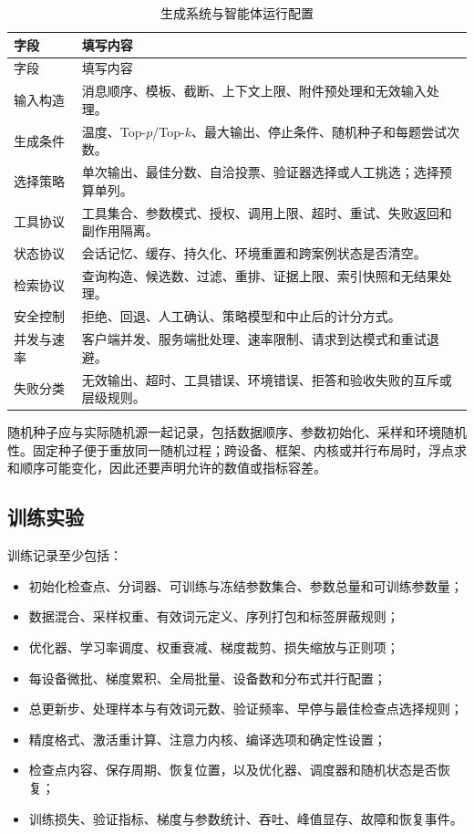 \documentclass[../workbook.tex]{subfiles}
\begin{document}
\begin{longtable}{@{}p{.25\linewidth}p{.66\linewidth}@{}}
\caption{生成系统与智能体运行配置}\label{tab:appendix-generation-protocol}\\
\toprule
字段 & 填写内容\\\midrule
\endfirsthead
\toprule
字段 & 填写内容\\\midrule
\endhead
输入构造 & 消息顺序、模板、截断、上下文上限、附件预处理和无效输入处理。\\
生成条件 & 温度、Top-$p$/Top-$k$、最大输出、停止条件、随机种子和每题尝试次数。\\
选择策略 & 单次输出、最佳分数、自洽投票、验证器选择或人工挑选；选择预算单列。\\
工具协议 & 工具集合、参数模式、授权、调用上限、超时、重试、失败返回和副作用隔离。\\
状态协议 & 会话记忆、缓存、持久化、环境重置和跨案例状态是否清空。\\
检索协议 & 查询构造、候选数、过滤、重排、证据上限、索引快照和无结果处理。\\
安全控制 & 拒绝、回退、人工确认、策略模型和中止后的计分方式。\\
并发与速率 & 客户端并发、服务端批处理、速率限制、请求到达模式和重试退避。\\
失败分类 & 无效输出、超时、工具错误、环境错误、拒答和验收失败的互斥或层级规则。\\
\bottomrule
\end{longtable}

随机种子应与实际随机源一起记录，包括数据顺序、参数初始化、采样和环境随机性。固定种子便于重放同一随机过程；跨设备、框架、内核或并行布局时，浮点求和顺序可能变化，因此还要声明允许的数值或指标容差。

\subsection{训练实验}

训练记录至少包括：
\begin{itemize}
 \item 初始化检查点、分词器、可训练与冻结参数集合、参数总量和可训练参数量；
 \item 数据混合、采样权重、有效词元定义、序列打包和标签屏蔽规则；
 \item 优化器、学习率调度、权重衰减、梯度裁剪、损失缩放与正则项；
 \item 每设备微批、梯度累积、全局批量、设备数和分布式并行配置；
 \item 总更新步、处理样本与有效词元数、验证频率、早停与最佳检查点选择规则；
 \item 精度格式、激活重计算、注意力内核、编译选项和确定性设置；
 \item 检查点内容、保存周期、恢复位置，以及优化器、调度器和随机状态是否恢复；
 \item 训练损失、验证指标、梯度与参数统计、吞吐、峰值显存、故障和恢复事件。
\end{itemize}
\end{document}
